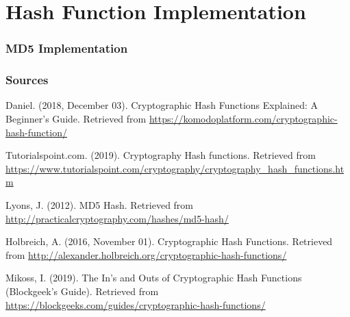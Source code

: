 \documentclass{beamer}
\begin{document}
\section{Hash Function Implementation}

\begin{frame}
\frametitle{MD5 Implementation}
\huge{}

\end{frame}

\begin{frame}
\frametitle{Sources}
\begin{thebibliography}{}
	\beamertemplatebookbibitems
	Daniel. (2018, December 03). Cryptographic Hash Functions Explained: A Beginner's Guide. Retrieved from \url{https://komodoplatform.com/cryptographic-hash-function/}
	
	Tutorialspoint.com. (2019). Cryptography Hash functions. Retrieved from \url{https://www.tutorialspoint.com/cryptography/cryptography_hash_functions.htm}
	
	Lyons, J. (2012). MD5 Hash. Retrieved from \url{http://practicalcryptography.com/hashes/md5-hash/}
	
	Holbreich, A. (2016, November 01). Cryptographic Hash Functions. Retrieved from \url{http://alexander.holbreich.org/cryptographic-hash-functions/}	
	
	Mikoss, I. (2019). The In's and Outs of Cryptographic Hash Functions (Blockgeek's Guide).
	Retrieved from \url{https://blockgeeks.com/guides/cryptographic-hash-functions/}
\end{thebibliography}
\end{frame}
\end{document}
